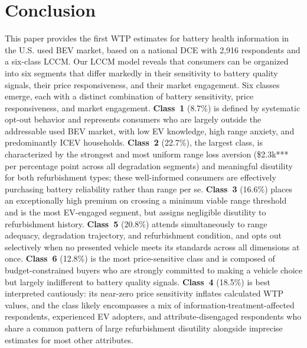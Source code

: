 \documentclass[a4paper,fleqn]{cas-sc}   %
\begin{document}
\section{Conclusion}
\label{section:conclusion}
This paper provides the first WTP estimates for battery health information in the U.S. used BEV market, based on a national DCE with 2,916 respondents and a six-class LCCM. Our LCCM model reveals that consumers can be organized into six segments that differ markedly in their sensitivity to battery quality signals, their price responsiveness, and their market engagement. Six classes emerge, each with a distinct combination of battery sensitivity, price responsiveness, and market engagement. \textbf{Class~1} (8.7\%) is defined by systematic opt-out behavior and represents consumers who are largely outside the addressable used BEV market, with low EV knowledge, high range anxiety, and predominantly ICEV households. \textbf{Class~2} (22.7\%), the largest class, is characterized by the strongest and most uniform range loss aversion (\$2.3k*** per percentage point across all degradation segments) and meaningful disutility for both refurbishment types; these well-informed consumers are effectively purchasing battery reliability rather than range per se. \textbf{Class~3} (16.6\%) places an exceptionally high premium on crossing a minimum viable range threshold and is the most EV-engaged segment, but assigns negligible disutility to refurbishment history. \textbf{Class~5} (20.8\%) attends simultaneously to range adequacy, degradation trajectory, and refurbishment condition, and opts out selectively when no presented vehicle meets its standards across all dimensions at once. \textbf{Class~6} (12.8\%) is the most price-sensitive class and is composed of budget-constrained buyers who are strongly committed to making a vehicle choice but largely indifferent to battery quality signals. \textbf{Class~4} (18.5\%) is best interpreted cautiously: its near-zero price sensitivity inflates calculated WTP values, and the class likely encompasses a mix of information-treatment-affected respondents, experienced EV adopters, and attribute-disengaged respondents who share a common pattern of large refurbishment disutility alongside imprecise estimates for most other attributes.
\end{document}
